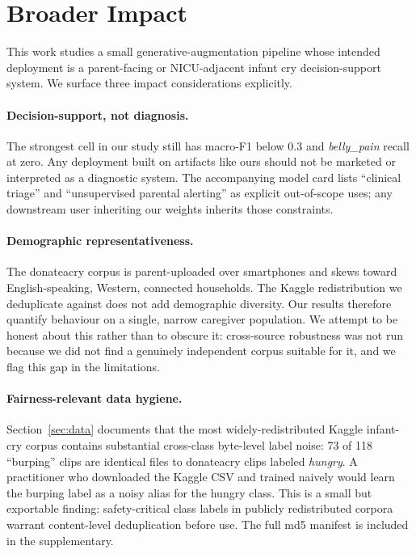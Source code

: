 \documentclass[10pt]{article}
\begin{document}
\section{Broader Impact}\label{sec:impact}
This work studies a small generative-augmentation pipeline whose intended deployment is a parent-facing or NICU-adjacent infant cry decision-support system. We surface three impact considerations explicitly.

\paragraph{Decision-support, not diagnosis.} The strongest cell in our study still has macro-F1 below 0.3 and \textit{belly\_pain} recall at zero. Any deployment built on artifacts like ours should not be marketed or interpreted as a diagnostic system. The accompanying model card lists ``clinical triage'' and ``unsupervised parental alerting'' as explicit out-of-scope uses; any downstream user inheriting our weights inherits those constraints.

\paragraph{Demographic representativeness.} The donateacry corpus is parent-uploaded over smartphones and skews toward English-speaking, Western, connected households. The Kaggle redistribution we deduplicate against does not add demographic diversity. Our results therefore quantify behaviour on a single, narrow caregiver population. We attempt to be honest about this rather than to obscure it: cross-source robustness was not run because we did not find a genuinely independent corpus suitable for it, and we flag this gap in the limitations.

\paragraph{Fairness-relevant data hygiene.} Section~\ref{sec:data} documents that the most widely-redistributed Kaggle infant-cry corpus contains substantial cross-class byte-level label noise: 73 of 118 ``burping'' clips are identical files to donateacry clips labeled \textit{hungry}. A practitioner who downloaded the Kaggle CSV and trained naively would learn the burping label as a noisy alias for the hungry class. This is a small but exportable finding: safety-critical class labels in publicly redistributed corpora warrant content-level deduplication before use. The full md5 manifest is included in the supplementary.
\end{document}
